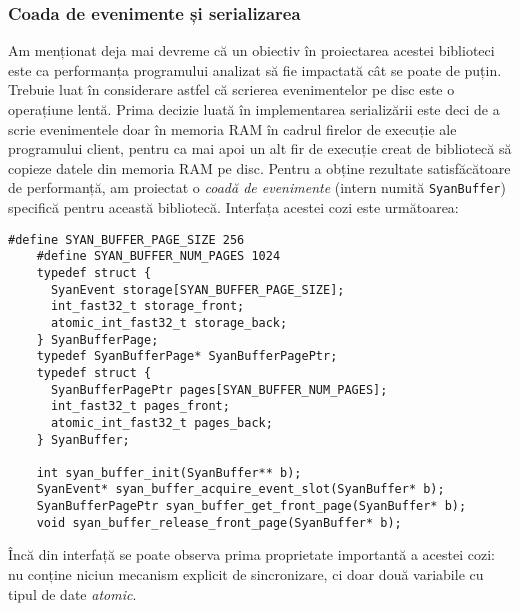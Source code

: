 \subsubsection{Coada de evenimente și serializarea}\label{section:queue}

Am menționat deja mai devreme că un obiectiv în proiectarea acestei
biblioteci este ca performanța programului analizat să fie impactată cât
se poate de puțin. Trebuie luat în considerare astfel că scrierea
evenimentelor pe disc este o operațiune lentă. Prima decizie luată în
implementarea serializării este deci de a scrie evenimentele doar în
memoria RAM în cadrul firelor de execuție ale programului client, pentru
ca mai apoi un alt fir de execuție creat de bibliotecă să copieze datele
din memoria RAM pe disc. Pentru a obține rezultate satisfăcătoare de
performanță, am proiectat o \textit{coadă de evenimente} (intern numită
\lstinline{SyanBuffer}) specifică pentru această bibliotecă. Interfața
acestei cozi este următoarea:

\begin{lstlisting}[caption=Interfața cozii de evenimente folosite în
                           bibliotecă]
    #define SYAN_BUFFER_PAGE_SIZE 256
    #define SYAN_BUFFER_NUM_PAGES 1024
    typedef struct {
      SyanEvent storage[SYAN_BUFFER_PAGE_SIZE];
      int_fast32_t storage_front;
      atomic_int_fast32_t storage_back;
    } SyanBufferPage;
    typedef SyanBufferPage* SyanBufferPagePtr;
    typedef struct {
      SyanBufferPagePtr pages[SYAN_BUFFER_NUM_PAGES];
      int_fast32_t pages_front;
      atomic_int_fast32_t pages_back;
    } SyanBuffer;

    int syan_buffer_init(SyanBuffer** b);
    SyanEvent* syan_buffer_acquire_event_slot(SyanBuffer* b);
    SyanBufferPagePtr syan_buffer_get_front_page(SyanBuffer* b);
    void syan_buffer_release_front_page(SyanBuffer* b);
\end{lstlisting}

Încă din interfață se poate observa prima proprietate importantă a
acestei cozi: nu conține niciun mecanism explicit de sincronizare, ci
doar două variabile cu tipul de date \textit{atomic}.

